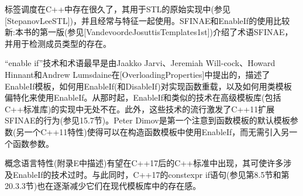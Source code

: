 标签调度在C++中存在很久了，其用于STL的原始实现中(参见[StepanovLeeSTL])，并且经常与特征一起使用。SFINAE和EnableIf的使用比较新:本书的第一版(参见[VandevoordeJosuttisTemplates1st])介绍了术语SFINAE，并用于检测成员类型的存在。

“enable if”技术和术语最早是由Jaakko Jarvi、Jeremiah Will-cock、Howard Hinnant和Andrew Lumsdaine在[OverloadingProperties]中提出的，描述了EnableIf模板，如何用EnableIf(和DisableIf)对实现函数重载，以及如何用类模板偏特化来使用EnableIf。从那时起，EnableIf和类似的技术在高级模板库(包括C++标准库)的实现中无处不在。此外，这些技术的流行激发了C++11扩展SFINAE的行为(参见15.7节)。Peter Dimov是第一个注意到函数模板的默认模板参数(另一个C++11特性)使得可以在构造函数模板中使用EnableIf，而无需引入另一个函数参数。

概念语言特性(附录E中描述)有望在C++17后的C++标准中出现，其可使许多涉及EnableIf的技术过时。与此同时，C++17的constexpr if语句(参见第8.5节和第20.3.3节)也在逐渐减少它们在现代模板库中的存在感。